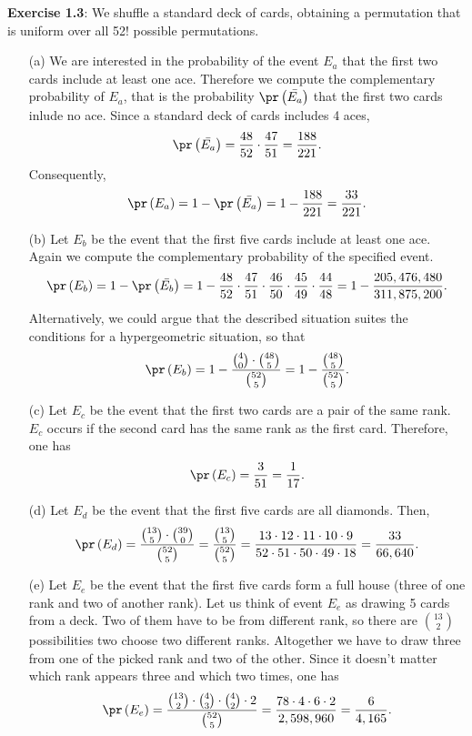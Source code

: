 \textbf{Exercise 1.3}: We shuffle a standard deck of cards, obtaining a permutation
that is uniform over all 52! possible permutations.

\begin{enumerate}
  \item[(a)] We are interested in the probability of the event $E_a$ that the
    first two cards include at least one ace. Therefore we compute the complementary
    probability of $E_a$, that is the probability $\pr\left(\bar{E_a}\right)$
    that the first two cards inlude no ace. Since a standard deck of cards
    includes 4 aces,
    \[ \pr\left(\bar{E_a}\right) = \frac{48}{52} \cdot \frac{47}{51} = \frac{188}{221}.\]
    Consequently,
    \[ \pr\left(E_a\right) = 1 - \pr\left(\bar{E_a}\right) = 1 - \frac{188}{221} = \frac{33}{221}.\]

  \item[(b)] Let $E_b$ be the event that the first five cards include at least one
    ace. Again we compute the complementary probability of the specified event.
    \[
      \pr\left(E_b\right)
        = 1 - \pr\left(\bar{E_b}\right)
        = 1 - \frac{48}{52} \cdot \frac{47}{51} \cdot \frac{46}{50} \cdot \frac{45}{49} \cdot \frac{44}{48}
        = 1 - \frac{205,476,480}{311,875,200}.
    \]
    Alternatively, we could argue that the described situation suites the conditions
    for a hypergeometric situation, so that
    \[
      \pr\left(E_b\right)
        = 1 - \frac{\binom{4}{0} \cdot \binom{48}{5}}{\binom{52}{5}}
        = 1 - \frac{\binom{48}{5}}{\binom{52}{5}}.
    \]

  \item[(c)] Let $E_c$ be the event that the first two cards are a pair of the
    same rank.  $E_c$ occurs if the second card has the same rank as the first
    card. Therefore, one has
    \[ \pr\left(E_c\right) = \frac{3}{51} = \frac{1}{17}.\]

  \item[(d)] Let $E_d$ be the event that the first five cards are all diamonds. Then,
    \[
      \pr\left(E_d\right)
        = \frac{\binom{13}{5} \cdot \binom{39}{0}}{\binom{52}{5}}
        = \frac{\binom{13}{5}}{\binom{52}{5}}
        = \frac{13 \cdot 12 \cdot 11 \cdot 10 \cdot 9}{52 \cdot 51 \cdot 50 \cdot 49 \cdot 18}
        = \frac{33}{66,640}.
    \]

  \item[(e)] Let $E_e$ be the event that the first five cards form a full house
    (three of one rank and two of another rank). Let us think of event $E_e$ as
    drawing 5 cards from a deck. Two of them have to be from different rank, so
    there are $\binom{13}{2}$ possibilities two choose two different ranks.
    Altogether we have to draw three from one of the picked rank and two of the
    other. Since it doesn't matter which rank appears three and which two times,
    one has
    \[
      \pr\left(E_e\right)
        = \frac{\binom{13}{2} \cdot \binom{4}{3} \cdot \binom{4}{2} \cdot 2}{\binom{52}{5}}
        = \frac{78 \cdot 4 \cdot 6 \cdot 2}{2,598,960}
        = \frac{6}{4,165}.
    \]
\end{enumerate}
